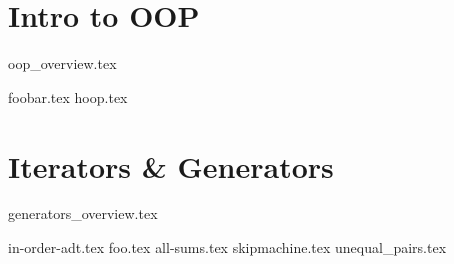 \documentclass{exam}
\begin{document}
\section{Intro to OOP}
{oop_overview.tex}
\begin{questions}
    {foobar.tex}
    {hoop.tex}
\end{questions}

\newpage
\section{Iterators \& Generators}
{generators_overview.tex}
\begin{questions}
    {in-order-adt.tex}
    \newpage
    {foo.tex}
    {all-sums.tex}
       \newpage
    {skipmachine.tex}
     {unequal_pairs.tex}
\end{questions}
\end{document}
